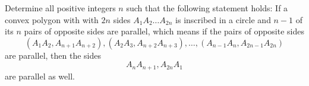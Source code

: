 Determine all positive integers $n$ such that the following statement holds: If a convex polygon with with $2n$ sides $A_1 A_2 \ldots A_{2n}$ is inscribed in a circle and $n-1$ of its $n$ pairs of opposite sides are parallel, which means if the pairs of opposite sides\[(A_1 A_2, A_{n+1} A_{n+2}), (A_2 A_3, A_{n+2} A_{n+3}), \ldots , (A_{n-1} A_n, A_{2n-1} A_{2n})\]
are parallel, then the sides \[ A_n A_{n+1}, A_{2n} A_1\] are parallel as well.
